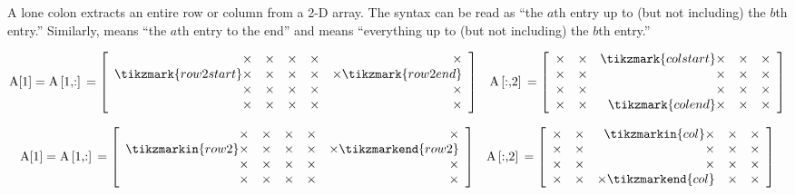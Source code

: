 A lone colon extracts an entire row or column from a 2-D array.
The syntax \li{[a:b]} can be read as ``the $a$th entry up to (but not including) the $b$th entry.''
Similarly, \li{[a:]} means ``the $a$th entry to the end'' and \li{[:b]} means ``everything up to (but not including) the $b$th entry.''


\begin{align*}
\text{\li{A[1]}} = \text{\li{A[1,:]}} =
\left[\begin{array}{rrrrr}
\times & \times & \times & \times & \times \\
\tikzmark{row2start} \times & \times & \times & \times & \times \tikzmark{row2end} \\
\times & \times & \times & \times & \times \\
\times & \times & \times & \times & \times \\
\end{array}\right]
&&
\text{\li{A[:,2]}} =
\left[\begin{array}{rrrrr}
\times & \times & \tikzmark{colstart} \times & \times & \times \\
\times & \times & \times & \times & \times \\
\times & \times & \times & \times & \times \\
\times & \times & \tikzmark{colend} \times & \times & \times \\
\end{array}\right]
\end{align*}



\begin{align*}
\text{\li{A[1]}} = \text{\li{A[1,:]}} = \left[\begin{array}{rrrrr}
\times & \times & \times & \times & \times\\
\tikzmarkin{row2}\times & \times & \times & \times & \times\tikzmarkend{row2}\\
\times & \times & \times & \times & \times\\
\times & \times & \times & \times & \times\\
\end{array}\right]
&&
\text{\li{A[:,2]}} = \left[\begin{array}{rrrrr}
\times & \times & \tikzmarkin{col}\times & \times & \times\\
\times & \times & \times & \times & \times\\
\times & \times & \times & \times & \times\\
\times & \times & \times\tikzmarkend{col} & \times & \times
\end{array}\right]
\end{align*}

